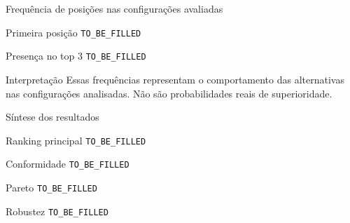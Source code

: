 \begin{frame}{Frequência de posições nas configurações avaliadas}

    \begin{block}{Primeira posição}
        \texttt{TO\_BE\_FILLED}
    \end{block}

    \vspace{0.2cm}

    \begin{block}{Presença no top 3}
        \texttt{TO\_BE\_FILLED}
    \end{block}

    \vspace{0.3cm}

    \begin{alertblock}{Interpretação}
        Essas frequências representam o comportamento das alternativas
        nas configurações analisadas. Não são probabilidades reais de
        superioridade.
    \end{alertblock}

\end{frame}



\begin{frame}{Síntese dos resultados}

    \begin{block}{Ranking principal}
        \texttt{TO\_BE\_FILLED}
    \end{block}

    \begin{block}{Conformidade}
        \texttt{TO\_BE\_FILLED}
    \end{block}

    \begin{block}{Pareto}
        \texttt{TO\_BE\_FILLED}
    \end{block}

    \begin{block}{Robustez}
        \texttt{TO\_BE\_FILLED}
    \end{block}

\end{frame}



